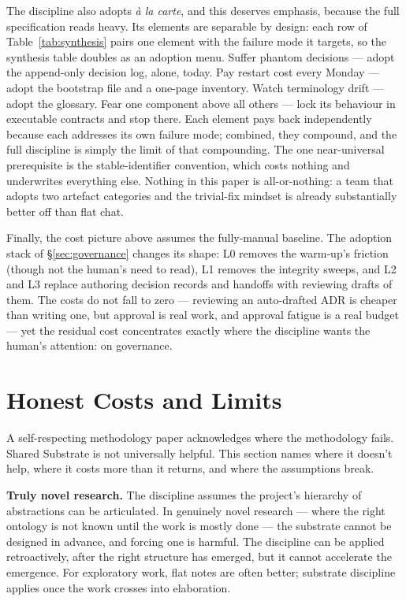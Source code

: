 \documentclass[11pt,a4paper,twocolumn]{article}
\begin{document}
The discipline also adopts \emph{\`a la carte}, and this deserves
emphasis, because the full specification reads heavy. Its elements
are separable by design: each row of Table~\ref{tab:synthesis}
pairs one element with the failure mode it targets, so the
synthesis table doubles as an adoption menu. Suffer phantom
decisions --- adopt the append-only decision log, alone, today.
Pay restart cost every Monday --- adopt the bootstrap file and a
one-page inventory. Watch terminology drift --- adopt the
glossary. Fear one component above all others --- lock its
behaviour in executable contracts and stop there. Each element
pays back independently because each addresses its own failure
mode; combined, they compound, and the full discipline is simply
the limit of that compounding. The one near-universal
prerequisite is the stable-identifier convention, which costs
nothing and underwrites everything else. Nothing in this paper is
all-or-nothing: a team that adopts two artefact categories and
the trivial-fix mindset is already substantially better off than
flat chat.

Finally, the cost picture above assumes the fully-manual
baseline. The adoption stack of \S\ref{sec:governance} changes its
shape: L0 removes the warm-up's friction (though not the human's
need to read), L1 removes the integrity sweeps, and L2 and L3
replace authoring decision records and handoffs with reviewing
drafts of them. The costs do not fall to zero --- reviewing an
auto-drafted ADR is cheaper than writing one, but approval is real
work, and approval fatigue is a real budget --- yet the residual
cost concentrates exactly where the discipline wants the human's
attention: on governance.

\section{Honest Costs and Limits}
\label{sec:limits}

A self-respecting methodology paper acknowledges where the
methodology fails. Shared Substrate is not universally
helpful. This section names where it doesn't help, where it costs
more than it returns, and where the assumptions break.

\textbf{Truly novel research.} The discipline assumes the project's
hierarchy of abstractions can be articulated. In genuinely novel
research --- where the right ontology is not known until the work
is mostly done --- the substrate cannot be designed in advance, and
forcing one is harmful. The discipline can be applied
retroactively, after the right structure has emerged, but it
cannot accelerate the emergence. For exploratory work, flat notes
are often better; substrate discipline applies once the work
crosses into elaboration.
\end{document}
